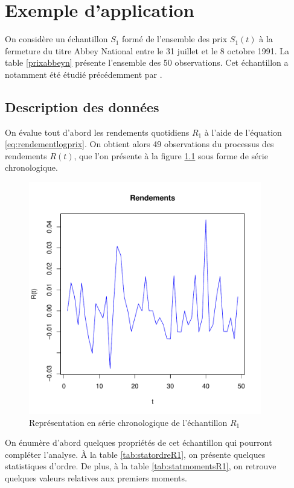 \chapter{Exemple d'application}
\label{chap:application}%

On considère un échantillon $S_1$ formé de l'ensemble des prix
$S_1(t)$ à la fermeture du titre Abbey National entre le 31 juillet et
le 8 octobre 1991. La table \ref{prixabbeyn} présente l'ensemble des 50
observations. Cet échantillon a notamment été étudié précédemment par
\cite{buckle1995bayesian}.

\section{Description des données}
\label{sec:analysepA}

On évalue tout d'abord les rendements quotidiens $R_1$ à l'aide de
l'équation \eqref{eq:rendementlogprix}. On obtient alors 49
observations du processus des rendements $R(t)$, que l'on présente à
la figure \ref{fig:seriechronoR1} sous forme de série chronologique.

\begin{figure}[!ht]
  \centering
  \includegraphics[height=4in,
  width=4in]{../graphiques/ABBEYN-chronologie.pdf}
  \caption{Représentation en série chronologique de l'échantillon
    $R_1$}
  \label{fig:seriechronoR1}
\end{figure}

On énumère d'abord quelques propriétés de cet échantillon qui pourront
compléter l'analyse. À la table \ref{tab:statordreR1}, on présente
quelques statistiques d'ordre. De plus, à la table
\ref{tab:statmomentsR1}, on retrouve quelques valeurs relatives aux
premiers moments.

